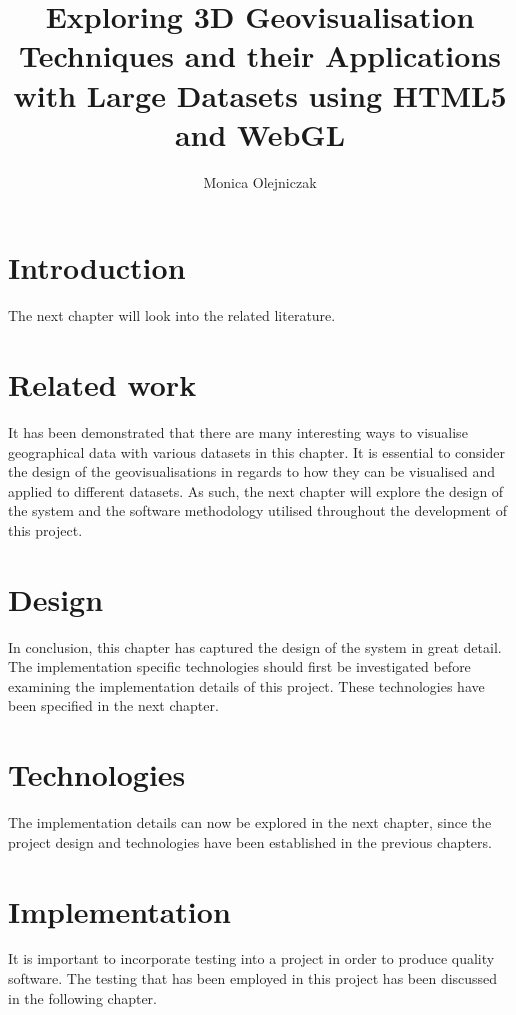 \documentclass[
	paper=A4,
	titlepage=true,
	appendixprefix=true,
	headings=appendixwithoutprefixline,
	fontsize=11pt,
	parskip=half
]{scrreprt}
\title{Exploring 3D Geovisualisation Techniques and their Applications with Large Datasets using HTML5 and WebGL}
\author{Monica Olejniczak}
\begin{document}
	
	
	\chapter{Introduction} {
	\label{ch:introduction}
		
	}

	The next chapter will look into the related literature.

	\chapter{Related work} {
	\label{ch:related_work}
		
	}

	It has been demonstrated that there are many interesting ways to visualise geographical data with various datasets in this chapter. It is essential to consider the design of the geovisualisations in regards to how they can be visualised and applied to different datasets. As such, the next chapter will explore the design of the system and the software methodology utilised throughout the development of this project.
	
	\chapter{Design} {
	\label{ch:design}
		
	}

	In conclusion, this chapter has captured the design of the system in great detail. The implementation specific technologies should first be investigated before examining the implementation details of this project. These technologies have been specified in the next chapter.

	\chapter{Technologies} {
	\label{ch:technologies}
		
	}

	The implementation details can now be explored in the next chapter, since the project design and technologies have been established in the previous chapters.
	
	\chapter{Implementation} {
	\label{ch:implementation}
		
	}

	It is important to incorporate testing into a project in order to produce quality software. The testing that has been employed in this project has been discussed in the following chapter.
\end{document}
